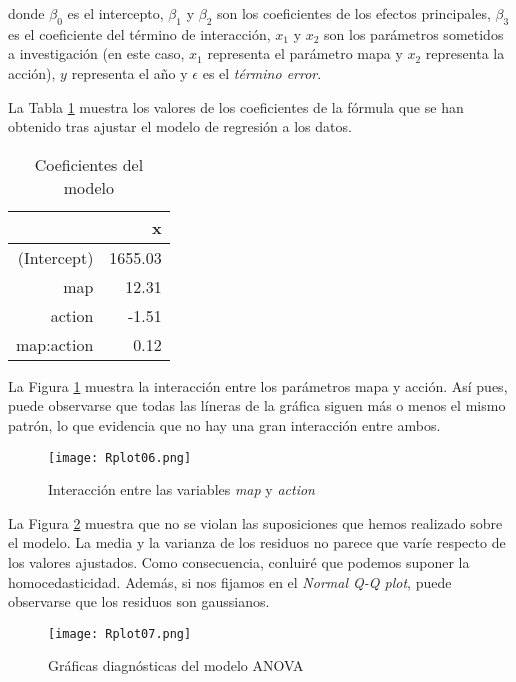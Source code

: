 \documentclass[10pt,a4paper]{article}
\begin{document}
donde $\beta_0$ es el intercepto, $\beta_1$ y $\beta_2$ son los coeficientes de los efectos principales, $\beta_3$ es el coeficiente del término de interacción, $x_1$ y $x_2$ son los parámetros sometidos a investigación (en este caso, $x_1$ representa el parámetro mapa y $x_2$ representa la acción), $y$ representa el año y $\epsilon$ es el \emph{término error}.

La Tabla \ref{table:4} muestra los valores de los coeficientes de la fórmula que se han obtenido tras ajustar el modelo de regresión a los datos.

\begin{table}[ht]
\centering
\begin{tabular}{rr}
  \hline
 & x \\ 
  \hline
(Intercept) & 1655.03 \\ 
  map & 12.31 \\ 
  action & -1.51 \\ 
  map:action & 0.12 \\ 
   \hline
\end{tabular}
\caption{Coeficientes del modelo}
\label{table:4}
\end{table}

La Figura \ref{fig:interaccion} muestra la interacción entre los parámetros mapa y acción. Así pues, puede observarse que todas las líneras de la gráfica siguen más o menos el mismo patrón, lo que evidencia que no hay una gran interacción entre ambos.

\begin{figure}[h]
    \centering
    \texttt{[image: Rplot06.png]}
    \caption{Interacción entre las variables \emph{map} y \emph{action}}
    \label{fig:interaccion}
\end{figure}


La Figura \ref{fig:suposiciones} muestra que no se violan las suposiciones que hemos realizado sobre el modelo. La media y la varianza de los residuos no parece que varíe respecto de los valores ajustados. Como consecuencia, conluiré que podemos suponer la homocedasticidad. Además, si nos fijamos en el \emph{Normal Q-Q plot}, puede observarse que los residuos son gaussianos.

\begin{figure}[h]
    \centering
    \texttt{[image: Rplot07.png]}
    \caption{Gráficas diagnósticas del modelo ANOVA}
    \label{fig:suposiciones}
\end{figure}
\end{document}
